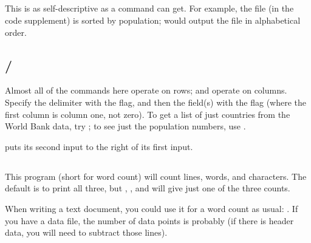
\subsection{} This is as self-descriptive as a command can
get. For example, the  file (in the code supplement)
is sorted by population;  would output the file in
alphabetical order.


\subsection{/} Almost all of the commands here
operate on rows;  and  operate on columns. Specify the
delimiter with the  flag, and then the field(s) with the 
flag (where the first column is column one, not zero). To get a list of
just countries from the World Bank data, try ; to see just the population numbers, use .

 puts its second input to the right of its first input. 


\subsection{} 
This program (short for word count) will count lines, words, and
characters. The default is to print all three, but , ,
and  will give just one of the three counts.

When writing a text document, you could use it for a word count as
usual: . If you have a data file, the number of
data points is probably  (if there is header data, you
will need to subtract those lines).

